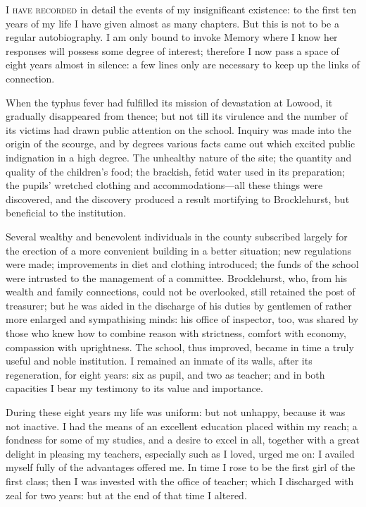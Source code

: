 
 \textsc{I have recorded} in detail the events of my insignificant
existence: to the first ten years of my life I have given almost as many
chapters. But this is not to be a regular autobiography. I am only
bound to invoke Memory where I know her responses will possess some
degree of interest; therefore I now pass a space of eight years almost
in silence: a few lines only are necessary to keep up the links of
connection.

When the typhus fever had fulfilled its mission of devastation at
Lowood, it gradually disappeared from thence; but not till its virulence
and the number of its victims had drawn public attention on the school.
Inquiry was made into the origin of the scourge, and by degrees various
facts came out which excited public indignation in a high degree. The
unhealthy nature of the site; the quantity and quality of the children's
food; the brackish, fetid water used in its preparation; the pupils'
wretched clothing and accommodations---all these things were discovered,
and the discovery produced a result mortifying to \Mr{} Brocklehurst, but
beneficial to the institution.

Several wealthy and benevolent individuals in the county subscribed
largely for the erection of a more convenient building in a better
situation; new regulations were made; improvements in diet and clothing
introduced; the funds of the school were intrusted to the management of
a committee. \Mr{} Brocklehurst, who, from his wealth and family
connections, could not be overlooked, still retained the post of
treasurer; but he was aided in the discharge of his duties by gentlemen
of rather more enlarged and sympathising minds: his office of inspector,
too, was shared by those who knew how to combine reason with strictness,
comfort with economy, compassion with uprightness. The school, thus
improved, became in time a truly useful and noble institution. I
remained an inmate of its walls, after its regeneration, for eight
years: six as pupil, and two as teacher; and in both capacities I bear
my testimony to its value and importance.

During these eight years my life was uniform: but not unhappy, because
it was not inactive. I had the means of an excellent education placed
within my reach; a fondness for some of my studies, and a desire to
excel in all, together with a great delight in pleasing my teachers,
especially such as I loved, urged me on: I availed myself fully of the
advantages offered me. In time I rose to be the first girl of the first
class; then I was invested with the office of teacher; which I
discharged with zeal for two years: but at the end of that time I
altered.

